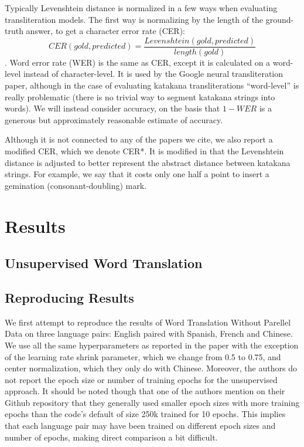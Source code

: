 \documentclass{article}
\begin{document}
Typically Levenshtein distance is normalized in a few ways
when evaluating transliteration models.
The first way is normalizing by the length of the ground-truth answer,
to get a character error rate (CER):
$$CER(gold, predicted) = \frac{Levenshtein(gold, predicted)}{length(gold)}$$.
Word error rate (WER) is the same as CER,
except it is calculated on a word-level instead of character-level.
It is used by the Google neural transliteration paper,
although in the case of evaluating katakana transliterations
``word-level'' is really problematic
(there is no trivial way to segment katakana strings into words).
We will instead consider accuracy,
on the basis that $1 - WER$
is a generous but approximately reasonable estimate of accuracy.

Although it is not connected to any of the papers we cite,
we also report a modified CER,
which we denote CER*.
It is modified in that the Levenshtein distance
is adjusted to better represent the abstract distance between katakana strings.
For example,
we say that it costs only one half a point
to insert a gemination (consonant-doubling) mark.

\section*{Results}

\subsection*{Unsupervised Word Translation}

\subsection*{Reproducing Results}

We first attempt to reproduce the results of Word Translation Without Parellel
Data on three language pairs: English paired with Spanish, French and Chinese.
We use all the same hyperparameters as reported in the paper with the exception
of the learning rate shrink parameter, which we change from 0.5 to 0.75, and
center normalization, which they only do with Chinese.
Moreover, the authors do not report the epoch size or number of training epochs
for the unsupervised approach. It should be noted though that one of the authors 
mention on their Github repository that they generally used smaller epoch sizes
with more training epochs than the code's default of size 250k trained for 10
epochs. This implies that each language pair may have been trained on different
epoch sizes and number of epochs, making direct comparison a bit difficult.
\end{document}
